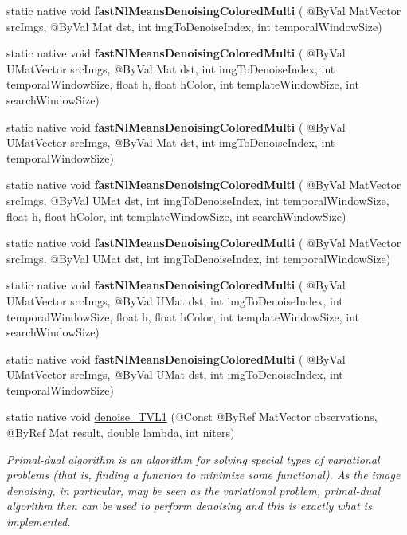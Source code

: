 \begin{DoxyCompactItemize}
static native void {\bfseries fast\+Nl\+Means\+Denoising\+Colored\+Multi} ( @By\+Val Mat\+Vector src\+Imgs, @By\+Val Mat dst, int img\+To\+Denoise\+Index, int temporal\+Window\+Size)
\item 
static native void {\bfseries fast\+Nl\+Means\+Denoising\+Colored\+Multi} ( @By\+Val U\+Mat\+Vector src\+Imgs, @By\+Val Mat dst, int img\+To\+Denoise\+Index, int temporal\+Window\+Size, float h, float h\+Color, int template\+Window\+Size, int search\+Window\+Size)
\item 
static native void {\bfseries fast\+Nl\+Means\+Denoising\+Colored\+Multi} ( @By\+Val U\+Mat\+Vector src\+Imgs, @By\+Val Mat dst, int img\+To\+Denoise\+Index, int temporal\+Window\+Size)
\item 
static native void {\bfseries fast\+Nl\+Means\+Denoising\+Colored\+Multi} ( @By\+Val Mat\+Vector src\+Imgs, @By\+Val U\+Mat dst, int img\+To\+Denoise\+Index, int temporal\+Window\+Size, float h, float h\+Color, int template\+Window\+Size, int search\+Window\+Size)
\item 
static native void {\bfseries fast\+Nl\+Means\+Denoising\+Colored\+Multi} ( @By\+Val Mat\+Vector src\+Imgs, @By\+Val U\+Mat dst, int img\+To\+Denoise\+Index, int temporal\+Window\+Size)
\item 
static native void {\bfseries fast\+Nl\+Means\+Denoising\+Colored\+Multi} ( @By\+Val U\+Mat\+Vector src\+Imgs, @By\+Val U\+Mat dst, int img\+To\+Denoise\+Index, int temporal\+Window\+Size, float h, float h\+Color, int template\+Window\+Size, int search\+Window\+Size)
\item 
static native void {\bfseries fast\+Nl\+Means\+Denoising\+Colored\+Multi} ( @By\+Val U\+Mat\+Vector src\+Imgs, @By\+Val U\+Mat dst, int img\+To\+Denoise\+Index, int temporal\+Window\+Size)
\item 
static native void \hyperlink{group__photo__denoise_ga69dacfb1b3386b1b2a2d270314c1b548}{denoise\+\_\+\+T\+V\+L1} (@Const @By\+Ref Mat\+Vector observations, @By\+Ref Mat result, double lambda, int niters)
\begin{DoxyCompactList}\small\item\em Primal-\/dual algorithm is an algorithm for solving special types of variational problems (that is, finding a function to minimize some functional). As the image denoising, in particular, may be seen as the variational problem, primal-\/dual algorithm then can be used to perform denoising and this is exactly what is implemented. \end{DoxyCompactList}\item 

\end{DoxyCompactItemize}
